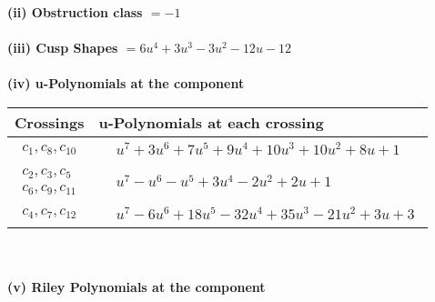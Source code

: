 \documentclass[1p]{elsarticle_modified}
\theoremstyle{definition}
\begin{document}
\flushleft \textbf{(ii) Obstruction class $= -1$}\\~\\
\flushleft \textbf{(iii) Cusp Shapes $= 6 u^4+3 u^3-3 u^2-12 u-12$}\\~\\
\newpage\renewcommand{\arraystretch}{1}
\flushleft \textbf{(iv) u-Polynomials at the component}\newline \\
\begin{tabular}{m{50pt}|m{274pt}}
Crossings & \hspace{64pt}u-Polynomials at each crossing \\
\hline $$\begin{aligned}c_{1},c_{8},c_{10}\end{aligned}$$&$\begin{aligned}
&u^7+3 u^6+7 u^5+9 u^4+10 u^3+10 u^2+8 u+1
\end{aligned}$\\
\hline $$\begin{aligned}c_{2},c_{3},c_{5}\\c_{6},c_{9},c_{11}\end{aligned}$$&$\begin{aligned}
&u^7- u^6- u^5+3 u^4-2 u^2+2 u+1
\end{aligned}$\\
\hline $$\begin{aligned}c_{4},c_{7},c_{12}\end{aligned}$$&$\begin{aligned}
&u^7-6 u^6+18 u^5-32 u^4+35 u^3-21 u^2+3 u+3
\end{aligned}$\\
\hline
\end{tabular}\\~\\
\newpage\renewcommand{\arraystretch}{1}
\flushleft \textbf{(v) Riley Polynomials at the component}\newline \\
\end{document}
